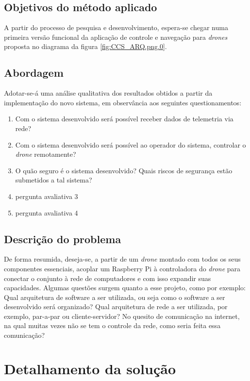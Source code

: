 \documentclass[12pt,a4paper,oneside]{book}
\begin{document}
\section{Objetivos do método aplicado}
A partir do processo de pesquisa e desenvolvimento, espera-se chegar numa primeira versão funcional da aplicação de controle e navegação para \textit{drones} proposta no diagrama da figura \ref{fig:CCS_ARQ.png.0}.

\section{Abordagem}
Adotar-se-á uma análise qualitativa dos resultados obtidos a partir da implementação do novo sistema, em observância aos seguintes questionamentos:
\begin{enumerate}
    \item Com o sistema desenvolvido será possível receber dados de telemetria via rede?
    \item Com o sistema desenvolvido será possível ao operador do sistema, controlar o \textit{drone} remotamente?
    \item O quão seguro é o sistema desenvolvido? Quais riscos de segurança estão submetidos a tal sistema?
    \item pergunta avaliativa 3
    \item pergunta avaliativa 4
\end{enumerate}
%
%

\section{Descrição do problema}
De forma resumida, deseja-se, a partir de um \textit{drone} montado com todos os seus componentes essenciais, acoplar um Raspberry Pi à controladora do \textit{drone} para conectar o conjunto à rede de computadores e com isso expandir suas capacidades. Algumas questões surgem quanto a esse projeto, como por exemplo: Qual arquitetura de software a ser utilizada, ou seja como o software a ser desenvolvido será organizado? Qual arquitetura de rede a ser utilizada, por exemplo, par-a-par ou cliente-servidor? No quesito de comunicação na internet, na qual muitas vezes não se tem o controle da rede, como seria feita essa comunicação?

%
\chapter{Detalhamento da solução}
%
\thispagestyle{empty} 
%
\end{document}
